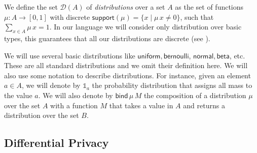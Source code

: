 \documentclass{sig-alternate-05-2015}
\theoremstyle{plain}
\theoremstyle{definition}
\theoremstyle{corollary}
\newcommand{\distr}{\mathcal{D}}
\newcommand{\charfun}{\ensuremath{\mathbb{1}}}
\begin{document}
We define the set $\distr(A)$ of {\em distributions} over a set $A$ as
the set of functions $\mu:A\to [0,1]$ with discrete
$\mathsf{support}(\mu)=\{x \mid \mu\,x\neq 0 \}$, such that $\sum_{x\in
  A}\mu\,x=1$. 
In our language we will consider only distribution over basic
types, this guarantees that all our distributions are
discrete
(see ). 

We will use several basic distributions like $\mathsf{uniform},
\mathsf{bernoulli}$, $\mathsf{normal},\mathsf{beta}$, etc. These are all standard distributions
and we omit their definition here. We will also use some notation to
describe distributions. For instance, given an element $a\in
A$, we will denote by  $\charfun_a$ the
probability distribution that assigns all mass to the value $a$. 
We will also denote by $\mathsf{bind}\, \mu\, M$ the composition of a
distribution $\mu$ over the set $A$ with a function $M$ that takes a value in
$A$ and returns a distribution over the set $B$.


\subsection{Differential Privacy}
\label{sec:dp}
\end{document}
